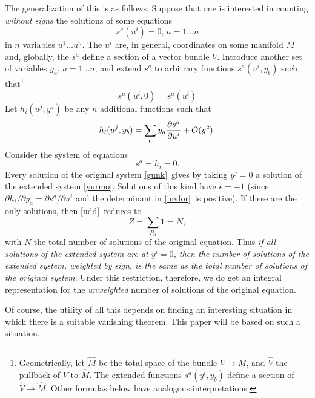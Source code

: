 \documentclass[12pt]{article}
\numberwithin{equation}{section}
\begin{document}
The generalization of this is as follows.  Suppose that one is interested
in counting {\it without signs} the solutions of some equations
\begin{equation}
  \label{gunk}
  s^a(u^i)=0,\, a=1\dots n
\end{equation}
in $n$ variables $u^1\dots u^n$.
The $u^i$ are, in general, coordinates on some manifold $M$ and, globally,
the $s^a$ define a section of a vector bundle $V$.
Introduce another set of variables
$y_a, \, a=1\dots n$, and extend $s^a$ to arbitrary functions
$s^a(u^i,y_b) $ such that\footnote{Geometrically, let $\widehat M$ be
  the total space of the bundle $V\to M$, and $\widehat V$ the pullback
  of $V$ to $\widehat M$.  The extended functions $s^a(y^i,y_b)$ define
  a section of $\widehat V\to\widehat M$.  Other formulas below have
analogous interpretations.}
\begin{equation}
  \label{ung}
  s^a(u^i,0)=s^a(u^i)
\end{equation}
Let $h_i(u^j,y^a)$
be any $n$ additional functions such that
\begin{equation}
  \label{unk}
  h_i(u^j,y_b)=\sum_ay_a{\partial s^a\over \partial u^i}+O(y^2).
\end{equation}
Consider the system
of equations
\begin{equation}
  \label{yurmo}
  s^a=h_i=0.
\end{equation}
Every solution of the original system \eqref{gunk}\ gives by taking $y^j=0$
a solution of the extended system \eqref{yurmo}.  Solutions of this kind
have $\epsilon=+1$ (since $\partial h_i/\partial y_a=\partial s^a/\partial
u^i$ and the determinant in \eqref{invfor}\ is positive).  If these are the only
solutions,
then \eqref{udd}\ reduces to
\begin{equation}
  \label{reddu}
  Z=\sum_{P_\alpha}1= N,
\end{equation}
with $N$ the total number of solutions of the original equation.
Thus {\it if all solutions of the extended system are at $y^i=0$,
  then the number of solutions of the extended system, weighted by
sign, is the same as the total number of solutions of the original system}.
Under this restriction, therefore, we do get an integral representation
for the {\it unweighted} number of solutions of the original equation.

Of course, the utility of all this depends on finding
an interesting situation in which there is a suitable
vanishing theorem.  This paper will be based on such a situation.
\end{document}
